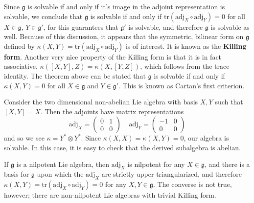 Since $\mathfrak{g}$ is solvable if and only if it's image in the adjoint representation is solvable, we conclude that $\mathfrak{g}$ is solvable if and only if $\text{tr}(\text{adj}_X \circ \text{adj}_Y) = 0$ for all $X \in \mathfrak{g}$, $Y \in \mathfrak{g}'$, for this guarantees that $\mathfrak{g}'$ is solvable, and therefore $\mathfrak{g}$ is solvable as well. Because of this discussion, it appears that the symmetric, bilinear form on $\mathfrak{g}$ defined by $\kappa(X,Y) = \text{tr}(\text{adj}_X \circ \text{adj}_Y)$ is of interest. It is known as the {\bf Killing form}. Another very nice property of the Killing form is that it is in fact associative, $\kappa([X,Y],Z) = \kappa(X,[Y,Z])$, which follows from the trace identity. The theorem above can be stated that $\mathfrak{g}$ is solvable if and only if $\kappa(X,Y) = 0$ for all $X \in \mathfrak{g}$ and $Y \in \mathfrak{g}'$. This is known as Cartan's first criterion.

\begin{example}
    Consider the two dimensional non-abelian Lie algebra with basis $X,Y$ such that $[X,Y] = X$. Then the adjoints have matrix representations
    \[ \text{adj}_X = \begin{pmatrix} 0 & 1 \\ 0 & 0 \end{pmatrix}\ \ \ \ \ \text{adj}_Y = \begin{pmatrix} -1 & 0 \\ 0 & 0 \end{pmatrix} \]
    and so we see $\kappa = Y^* \otimes Y^*$. Since $\kappa(X,X) = \kappa(X,Y) = 0$, our algebra is solvable. In this case, it is easy to check that the derived subalgebra is abelian.
\end{example}

\begin{example}
    If $\mathfrak{g}$ is a nilpotent Lie algebra, then $\text{adj}_X$ is nilpotent for any $X \in \mathfrak{g}$, and there is a basis for $\mathfrak{g}$ upon which the $\text{adj}_X$ are strictly upper triangularized, and therefore $\kappa(X,Y) = \text{tr}(\text{adj}_X \circ \text{adj}_Y) = 0$ for any $X,Y \in \mathfrak{g}$. The converse is not true, however; there are non-nilpotent Lie algebras with trivial Killing form.
\end{example}

